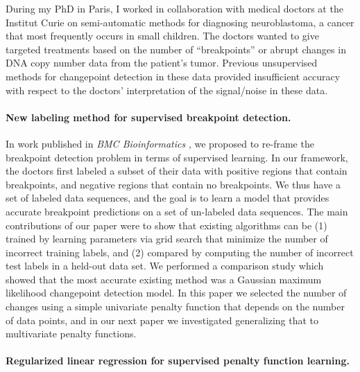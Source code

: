 \documentclass{article}
\begin{document}
During my PhD in Paris, I worked in collaboration with medical doctors
at the Institut Curie on semi-automatic methods for diagnosing
neuroblastoma, a cancer that most frequently occurs in small
children. The doctors wanted to give targeted treatments based on the
number of ``breakpoints'' or abrupt changes in DNA copy number data
from the patient's tumor. Previous unsupervised methods for
changepoint detection in these data provided insufficient accuracy
with respect to the doctors' interpretation of the signal/noise in
these data. 

\paragraph{New labeling method for supervised breakpoint detection.}

In work published in \emph{BMC Bioinformatics}
\citep{HOCKING-breakpoints}, we proposed to re-frame the breakpoint
detection problem in terms of supervised learning. In our framework,
the doctors first labeled a subset of their data with positive regions
that contain breakpoints, and negative regions that contain no
breakpoints. We thus have a set of labeled data sequences, and the
goal is to learn a model that provides accurate breakpoint predictions
on a set of un-labeled data sequences. The main contributions of our
paper were to show that existing algorithms can be (1) trained by
learning parameters via grid search that minimize the number of
incorrect training labels, and (2) compared by computing the number of
incorrect test labels in a held-out data set. We performed a
comparison study which showed that the most accurate existing method
was a Gaussian maximum likelihood changepoint detection model. 
In this paper we selected the number of changes using a
simple univariate penalty function that depends on the number of data
points, and in our next paper we investigated generalizing that to
multivariate penalty functions.

\paragraph{Regularized linear regression for supervised penalty
  function learning.} 
\end{document}
